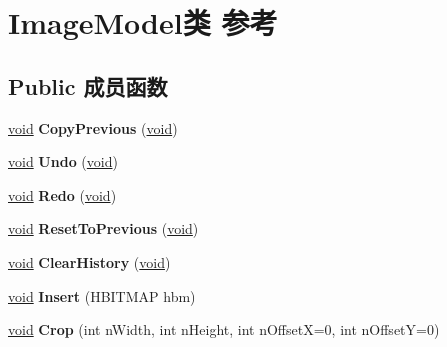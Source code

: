 \hypertarget{class_image_model}{}\section{Image\+Model类 参考}
\label{class_image_model}
\subsection*{Public 成员函数}
\begin{DoxyCompactItemize}
\item 
\mbox{\label{class_image_model_a3c0b0e2bb05f9e70e93fba24cfec720e}} 
\hyperlink{interfacevoid}{void} {\bfseries Copy\+Previous} (\hyperlink{interfacevoid}{void})
\item 
\mbox{\label{class_image_model_aa4c282947caca253c3a8d6c2927aecb3}} 
\hyperlink{interfacevoid}{void} {\bfseries Undo} (\hyperlink{interfacevoid}{void})
\item 
\mbox{\label{class_image_model_a7b27e12e67b525fccaeddea07acbce54}} 
\hyperlink{interfacevoid}{void} {\bfseries Redo} (\hyperlink{interfacevoid}{void})
\item 
\mbox{\label{class_image_model_a049d99a347a3690553ba6c48a6452121}} 
\hyperlink{interfacevoid}{void} {\bfseries Reset\+To\+Previous} (\hyperlink{interfacevoid}{void})
\item 
\mbox{\label{class_image_model_adb88cbd04186656df83666fcd768dc94}} 
\hyperlink{interfacevoid}{void} {\bfseries Clear\+History} (\hyperlink{interfacevoid}{void})
\item 
\mbox{\label{class_image_model_a63aec35ebf755b36f117b047b529c72f}} 
\hyperlink{interfacevoid}{void} {\bfseries Insert} (H\+B\+I\+T\+M\+AP hbm)
\item 
\mbox{\label{class_image_model_aa726e8f5ac7140e592620e56a6ea82db}} 
\hyperlink{interfacevoid}{void} {\bfseries Crop} (int n\+Width, int n\+Height, int n\+OffsetX=0, int n\+OffsetY=0)
\item 
\mbox{\label{class_image_model_a5922351ec2d7b9f89ee0d44f67e69048}} 

\end{DoxyCompactItemize}
